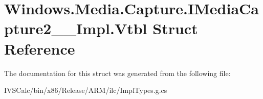 \hypertarget{struct_windows_1_1_media_1_1_capture_1_1_i_media_capture2_____impl_1_1_vtbl}{}\section{Windows.\+Media.\+Capture.\+I\+Media\+Capture2\+\_\+\+\_\+\+Impl.\+Vtbl Struct Reference}
\label{struct_windows_1_1_media_1_1_capture_1_1_i_media_capture2_____impl_1_1_vtbl}


The documentation for this struct was generated from the following file\+:\begin{DoxyCompactItemize}
\item 
I\+V\+S\+Calc/bin/x86/\+Release/\+A\+R\+M/ilc/Impl\+Types.\+g.\+cs\end{DoxyCompactItemize}
